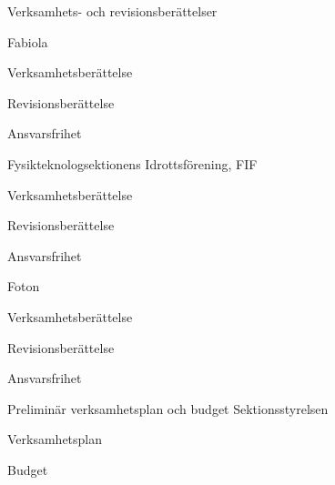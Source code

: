 \documentclass{sektionsmote}
\begin{document}
\begin{ootd}
\item{Verksamhets- och revisionsberättelser}
\begin{ootd}
    \item Fabiola
    \begin{ootd}
        \item Verksamhetsberättelse
        \item Revisionsberättelse
        \item Ansvarsfrihet
    \end{ootd}
    \item Fysikteknologsektionens Idrottsförening, FIF
    \begin{ootd}
        \item Verksamhetsberättelse
        \item Revisionsberättelse
        \item Ansvarsfrihet
    \end{ootd}
    \item Foton
    \begin{ootd}
        \item Verksamhetsberättelse
        \item Revisionsberättelse
        \item Ansvarsfrihet
    \end{ootd}
\end{ootd}

\item{Preliminär verksamhetsplan och budget Sektionsstyrelsen}
\begin{ootd}
    \item Verksamhetsplan
    \item Budget
\end{ootd}



\end{ootd}
\end{document}
